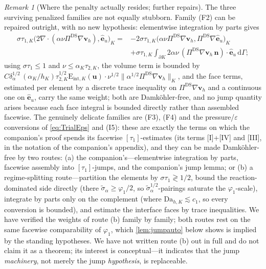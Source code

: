 \documentclass[11pt]{article}
\theoremstyle{remark}
\newtheorem{remark}[theorem]{Remark}
\newcommand{\bu}{\boldsymbol{u}}
\newcommand{\bv}{\boldsymbol{v}}
\newcommand{\bn}{\boldsymbol{n}}
\newcommand{\ViscProj}{\Pi^{\mathrm{DS}}}
\newcommand{\Eint}[2]{\mathrm{E}_{\mathrm{int},#1}(#2)}
\newcommand{\Dah}{\mathrm{Da}_{h,K}}
\newcommand{\st}{\widetilde{\sigma}_\alpha}
\begin{document}
\begin{remark}[Where the penalty actually resides; further repairs]
\label{rem:sharper}
The three surviving penalized families are not equally stubborn. Family (F2) can be
repaired outright, with no new hypothesis: elementwise integration by parts gives
\begin{align*}
  \sigma\tau_{1,K}\bigl(2\nabla\cdot(\alpha\nu\ViscProj\nabla\bv_h),
  \hat{\boldsymbol e}_u\bigr)_K
  ={}& -2\sigma\tau_{1,K}\bigl(\alpha\nu\ViscProj\nabla\bv_h,
  \ViscProj\nabla\hat{\boldsymbol e}_u\bigr)_K \\
  &+ \sigma\tau_{1,K}\int_{\partial K} 2\alpha\nu\,
  (\ViscProj\nabla\bv_h\,\bn)\cdot\hat{\boldsymbol e}_u\,\mathrm{d}\Gamma;
\end{align*}
using $\sigma\tau_1 \le 1$ and $\nu \le \alpha_K\tau_{2,K}$, the volume term is
bounded by
$C\delta_\alpha^{1/2}\,(\alpha_K/h_K)\tau_{2,K}^{1/2}\Eint{K}{\bu}\cdot
\nu^{1/2}\lVert\alpha^{1/2}\ViscProj\nabla\bv_h\rVert_K$, and the face terms,
estimated per element by a discrete trace inequality on $\ViscProj\nabla\bv_h$ and a
continuous one on $\hat{\boldsymbol e}_u$, carry the same weight; both are
Damk\"ohler-free, and no jump quantity arises because each face integral is bounded
directly rather than assembled facewise. The genuinely delicate families are (F3),
(F4) and the pressure/$\varepsilon$ conversions of \cref{eq:TrialEps} and (I5):
these are exactly the terms on which the companion's proof spends its facewise
$[\tau_1]$-estimates (its terms [I]+[IV] and [III], in the notation of the
companion's appendix), and they can be made Damk\"ohler-free by two routes: (a) the
companion's---elementwise integration by parts, facewise assembly into
$[\tau_1]$-jumps, and the companion's jump lemma; or (b) a regime-splitting
route---partition the elements by $\sigma\tau_1 \gtrless 1/2$, bound the
reaction-dominated side directly (there $\st \ge \varphi_1/2$, so
$\st^{1/2}$-pairings saturate the $\varphi_1$-scale), integrate by parts only on the
complement (where $\Dah \lesssim c_1$, so every conversion is bounded), and estimate
the interface faces by trace inequalities. We have verified the weights of route (b)
family by family; both routes rest on the same facewise comparability of $\varphi_1$,
which \cref{lem:jumpauto} below shows is implied by the standing hypotheses. We have
not written route (b) out in full and do not claim it as a theorem; its interest is
conceptual---it indicates that the jump \emph{machinery}, not merely the jump
\emph{hypothesis}, is replaceable.
\end{remark}
\end{document}
